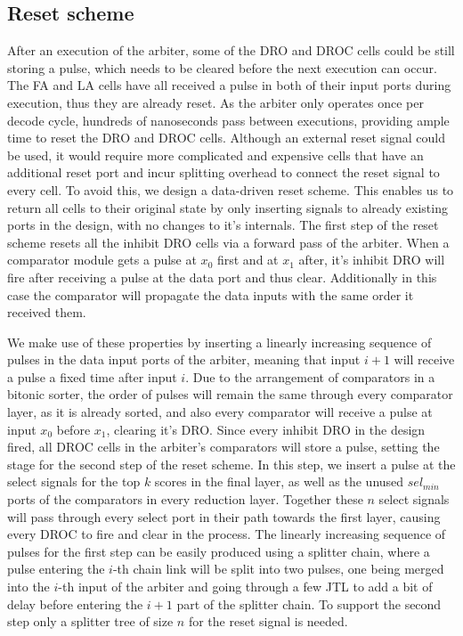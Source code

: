 \subsection{Reset scheme}

After an execution of the arbiter, some of the DRO and DROC cells could be still storing a pulse, which needs to be cleared before the next execution can occur.
The FA and LA cells have all received a pulse in both of their input ports during execution, thus they are already reset.
As the arbiter only operates once per decode cycle, hundreds of nanoseconds pass between executions, providing ample time to reset the DRO and DROC cells.
Although an external reset signal could be used, it would require more complicated and expensive cells that have an additional reset port and incur splitting overhead to connect the reset signal to every cell.
To avoid this, we design a data-driven reset scheme.
This enables us to return all cells to their original state by only inserting signals to already existing ports in the design, with no changes to it's internals.
The first step of the reset scheme resets all the inhibit DRO cells via a forward pass of the arbiter.
When a comparator module gets a pulse at $x_0$ first and at $x_1$ after, it's inhibit DRO will fire after receiving a pulse at the data port and thus clear.
Additionally in this case the comparator will propagate the data inputs with the same order it received them.

We make use of these properties by inserting a linearly increasing sequence of pulses in the data input ports of the arbiter, meaning that input $i+1$ will receive a pulse a fixed time after input $i$.
Due to the arrangement of comparators in a bitonic sorter, the order of pulses will remain the same through every comparator layer, as it is already sorted, and also every comparator will receive a pulse at input $x_0$ before $x_1$, clearing it's DRO.
Since every inhibit DRO in the design fired, all DROC cells in the arbiter's comparators will store a pulse, setting the stage for the second step of the reset scheme.
In this step, we insert a pulse at the select signals for the top $k$ scores in the final layer, as well as the unused $sel_{min}$ ports of the comparators in every reduction layer.
Together these $n$ select signals will pass through every select port in their path towards the first layer, causing every DROC to fire and clear in the process.
The linearly increasing sequence of pulses for the first step can be easily produced using a splitter chain, where a pulse entering the $i$-th chain link will be split into two pulses, one being merged into the $i$-th input of the arbiter and going through a few JTL to add a bit of delay before entering the $i+1$ part of the splitter chain.
To support the second step only a splitter tree of size $n$ for the reset signal is needed.

